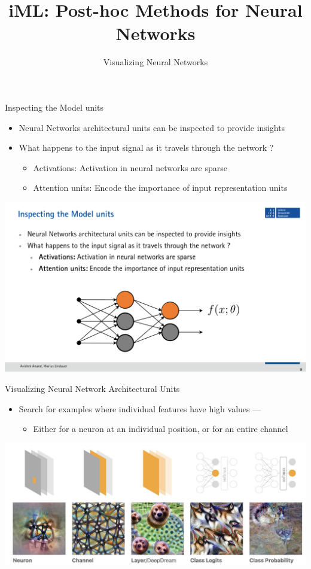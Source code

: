 \documentclass[11pt,compress,t,notes=noshow, aspectratio=169, xcolor=table]{beamer}
\title{iML: Post-hoc Methods for Neural Networks}
\subtitle{Visualizing Neural Networks}
\begin{document}
	\maketitle
	\graphicspath{ {./figure/} }
	
\begin{frame}[c]{Inspecting the Model units}
    \begin{itemize}
        \item Neural Networks architectural units can be inspected to provide insights
        \item What happens to the input signal as it travels through the network ?
        \begin{itemize}
            \item Activations: Activation in neural networks are sparse
            \item Attention units: Encode the importance of input representation units
        \end{itemize}
    \end{itemize}
    
    \centering
    \includegraphics[scale=1]{slides/gradient-based/figure/iml-grad-nn.pdf}
\end{frame}

\begin{frame}{Visualizing Neural Network Architectural Units}
    \begin{itemize}
        \item Search for examples where individual features have high values —
        \begin{itemize}
            \item Either for a neuron at an individual position, or for an entire channel
        \end{itemize}
    \end{itemize}
    
    \includegraphics[scale=.47]{img180}
\end{frame}
    
\end{document}
